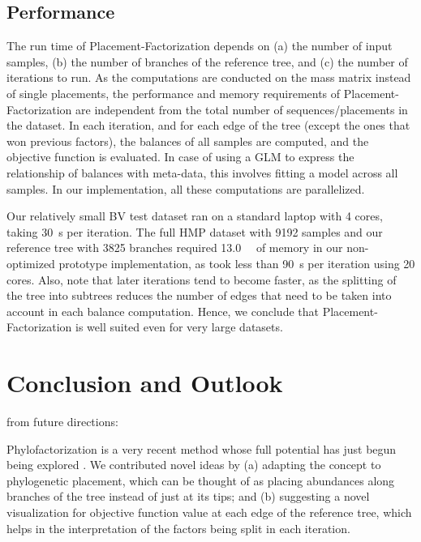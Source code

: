 \subsection{Performance}
\label{ch:Factorization:sec:Evaluation:sub:Performance}

The run time of Placement-Factorization depends on
(a) the number of input samples, (b) the number of branches of the reference tree, and (c) the number of iterations to run.
As the computations are conducted on the mass matrix instead of single placements,
the performance and memory requirements of Placement-Factorization are independent
from the total number of sequences/placements in the dataset.
In each iteration, and for each edge of the tree (except the ones that won previous factors),
the balances of all samples are computed, and the objective function is evaluated.
In case of using a \ac{GLM} to express the relationship of balances with meta-data,
this involves fitting a model across all samples.
In our implementation, all these computations are parallelized.

Our relatively small \ac{BV} test dataset ran on a standard laptop with \num{4} cores,
taking \SI{30}{\second} per iteration.
The full \ac{HMP} dataset with \num{9 192} samples and our reference tree with \num{3 825} branches
required \SI{13.0}{\giga\byte} of memory in our non-optimized prototype implementation,
as took less than \SI{90}{\second} per iteration using \num{20} cores.
Also, note that later iterations tend to become faster,
as the splitting of the tree into subtrees reduces the number of edges
that need to be taken into account in each balance computation.
Hence, we conclude that Placement-Factorization is well suited even for very large datasets.


\section{Conclusion and Outlook}
\label{ch:Factorization:sec:ConclusionOutlook}

from future directions:

Phylofactorization is a very recent method whose full potential has just begun being explored \cite{Washburne2019}.
We contributed novel ideas by
(a) adapting the concept to phylogenetic placement,
which can be thought of as placing abundances along branches of the tree instead of just at its tips;
and (b) suggesting a novel visualization for objective function value at each edge of the reference tree,
which helps in the interpretation of the factors being split in each iteration.

